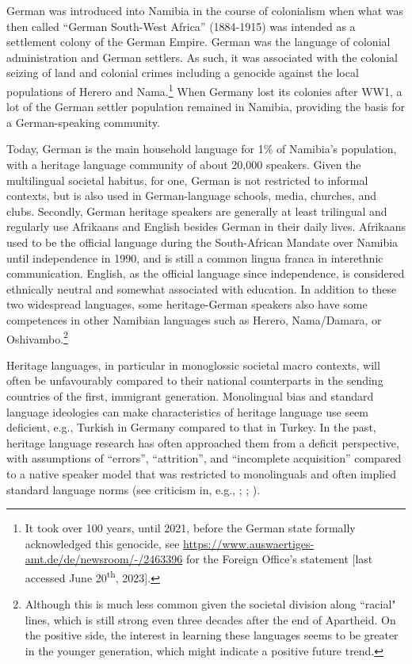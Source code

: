 German was introduced into Namibia in the course of colonialism when what was then called “German South-West Africa” (1884-1915) was intended as a settlement colony of the German Empire. German was the language of colonial administration and German settlers. As such, it was associated with the colonial seizing of land and colonial crimes including a genocide against the local populations of Herero and Nama.\footnote{It took over 100 years, until 2021, before the German state formally acknowledged this genocide, see \url{https://www.auswaertiges-amt.de/de/newsroom/-/2463396} for the Foreign Office’s statement [last accessed June 20\textsuperscript{th}, 2023].} When Germany lost its colonies after WW1, a lot of the German settler population remained in Namibia, providing the basis for a German-speaking community.

Today, German is the main household language for 1\% of Namibia’s population, with a heritage language community of about 20,000 speakers. Given the multilingual societal habitus, for one, German is not restricted to informal contexts, but is also used in German-language schools, media, churches, and clubs. Secondly, German heritage speakers are generally at least trilingual and regularly use Afrikaans and English besides German in their daily lives. Afrikaans used to be the official language during the South-African Mandate over Namibia until independence in 1990, and is still a common lingua franca in interethnic communication. English, as the official language since independence, is considered ethnically neutral and somewhat associated with education. In addition to these two widespread languages, some heritage-German speakers also have some competences in other Namibian languages such as Herero, Nama/Damara, or Oshivambo.\footnote{Although this is much less common given the societal division along “racial" lines, which is still strong even three decades after the end of Apartheid. On the positive side, the interest in learning these languages seems to be greater in the younger generation, which might indicate a positive future trend.}

Heritage languages, in particular in monoglossic societal macro contexts, will often be unfavourably compared to their national counterparts in the sending countries of the first, immigrant generation. Monolingual bias and standard language ideologies can make characteristics of heritage language use seem deficient, e.g., Turkish in Germany compared to that in Turkey. In the past, heritage language research has often approached them from a deficit perspective, with assumptions of “errors”, “attrition”, and “incomplete acquisition” compared to a native speaker model that was restricted to monolinguals and often implied standard language norms (see criticism in, e.g., \citealt{RothmanTreffers-Daller2014}; \citealt{Flores2017}; \citealt{WieseEtal2022_continuum}).

